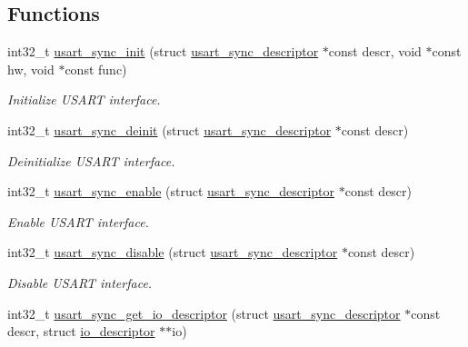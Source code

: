 \subsection*{Functions}
\begin{DoxyCompactItemize}
\item 
int32\+\_\+t \hyperlink{group__doc__driver__hal__usart__sync_gaa3cca792d7af7f180c5084af8ffd11c3}{usart\+\_\+sync\+\_\+init} (struct \hyperlink{structusart__sync__descriptor}{usart\+\_\+sync\+\_\+descriptor} $\ast$const descr, void $\ast$const hw, void $\ast$const func)
\begin{DoxyCompactList}\small\item\em Initialize U\+S\+A\+RT interface. \end{DoxyCompactList}\item 
int32\+\_\+t \hyperlink{group__doc__driver__hal__usart__sync_gae8076ed0a30199bd526f1da22e2095d3}{usart\+\_\+sync\+\_\+deinit} (struct \hyperlink{structusart__sync__descriptor}{usart\+\_\+sync\+\_\+descriptor} $\ast$const descr)
\begin{DoxyCompactList}\small\item\em Deinitialize U\+S\+A\+RT interface. \end{DoxyCompactList}\item 
int32\+\_\+t \hyperlink{group__doc__driver__hal__usart__sync_ga351aa9c8c94b4e8b0eb5efb1ecd74a82}{usart\+\_\+sync\+\_\+enable} (struct \hyperlink{structusart__sync__descriptor}{usart\+\_\+sync\+\_\+descriptor} $\ast$const descr)
\begin{DoxyCompactList}\small\item\em Enable U\+S\+A\+RT interface. \end{DoxyCompactList}\item 
int32\+\_\+t \hyperlink{group__doc__driver__hal__usart__sync_ga76abe691b76e4b95b4e3a7d5bc79b026}{usart\+\_\+sync\+\_\+disable} (struct \hyperlink{structusart__sync__descriptor}{usart\+\_\+sync\+\_\+descriptor} $\ast$const descr)
\begin{DoxyCompactList}\small\item\em Disable U\+S\+A\+RT interface. \end{DoxyCompactList}\item 
int32\+\_\+t \hyperlink{group__doc__driver__hal__usart__sync_gaf0b9c8819dc24f75e4f87f050edc81f5}{usart\+\_\+sync\+\_\+get\+\_\+io\+\_\+descriptor} (struct \hyperlink{structusart__sync__descriptor}{usart\+\_\+sync\+\_\+descriptor} $\ast$const descr, struct \hyperlink{structio__descriptor}{io\+\_\+descriptor} $\ast$$\ast$io)
$$
\end{DoxyCompactItemize}
